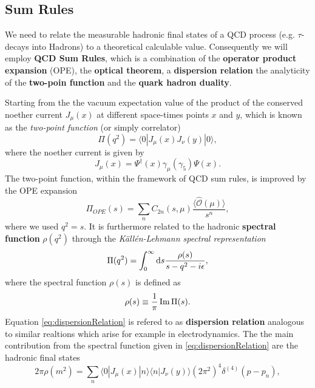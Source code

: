 \documentclass[../../index.tex]{subfiles}
\begin{document}
\subsection{Sum Rules}
We need to relate the measurable hadronic final states of a QCD process (e.g.
$\tau$-decays into Hadrons) to a theoretical calculable value. Consequently we will employ \textbf{QCD Sum Rules}\cite{Shifman1978}, which is a combination of the \textbf{operator
  product expansion} (OPE), the \textbf{optical theorem}, a \textbf{dispersion
relation} the analyticity of the \textbf{two-poin function} and the \textbf{quark
hadron duality}. 

Starting from the the vacuum expectation value of the product of the conserved
noether current $J_\mu(x)$ at different space-times points $x$ and $y$, which
is known as the
\textit{two-point function} (or simply correlator)
\begin{equation}
  \label{eq:twoPointFunction}
  \Pi(q^2) = \langle  0 | J_\mu(x) J_\nu(y) | 0 \rangle,
\end{equation}
where the noether current is given by
\begin{equation}
  J_\mu(x) = \Psi^\dagger(x) \gamma_\mu (\gamma_5) \Psi(x).
\end{equation}
The two-point function, within the framework of QCD sum rules, is improved by
the OPE expansion
\begin{equation}
  \Pi_{OPE}(s) = \sum_n C_{2n}(s, \mu) \frac{\langle \hat{\mathcal{O}} (\mu) \rangle }{s^{n}},
\end{equation}
where we used $q^2=s$. It is furthermore related to the hadronic
\textbf{spectral function} $\rho(q^2)$ through the \textit{Källén-Lehmann
  spectral representation} \cite{Kallen1952}\cite{Lehmann1954}
\begin{equation}
  \label{eq:dispersionRelation}
  \Pi(q^2) = \int_0^\infty \dif s \frac{\rho(s)}{s - q^2 - i \epsilon},
\end{equation}
where the spectral function $\rho(s)$ is defined as
\begin{equation}
  \rho(s) \equiv \frac{1}{\pi} \operatorname{Im} \Pi(s).
\end{equation}
Equation \ref{eq:dispersionRelation} is refered to as \textbf{dispersion relation} analogous to similar
realtions which arise for example in electrodynamics.
The the main contribution from the spectral function given in
\cref{eq:dispersionRelation} are the hadronic final states
\begin{equation}
  2 \pi \rho(m^2) = \sum_n \langle  0 | J_\mu(x) | n \rangle \langle n | J_\nu(y) \rangle (2 \pi^2)^4 \delta^{(4)}(p - p_n),
\end{equation}
\end{document}
